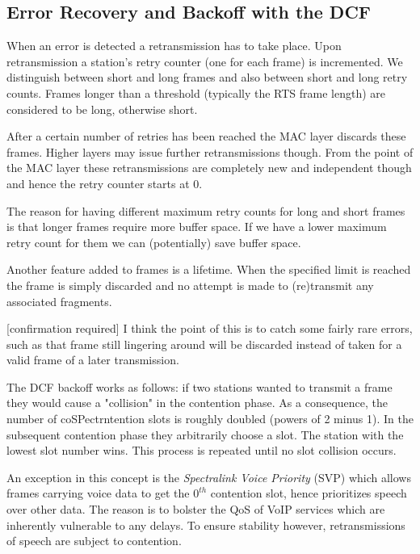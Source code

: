 \documentclass{article}
\begin{document}
	\subsection{Error Recovery and Backoff with the DCF}
	
	When an error is detected a retransmission has to take place. Upon retransmission a station's retry counter (one for each frame) is incremented. We distinguish between short and long frames and also between short and long retry counts. Frames longer than a threshold (typically the RTS frame length) are considered to be long, otherwise short.
	
	\bigskip
	
	After a certain number of retries has been reached the MAC layer discards these frames. Higher layers may issue further retransmissions though. From the point of the MAC layer these retransmissions are completely new and independent though and hence the retry counter starts at 0.
	
	\bigskip
	
	The reason for having different maximum retry counts for long and short frames is that longer frames require more buffer space. If we have a lower maximum retry count for them we can (potentially) save buffer space.
	
	\bigskip
	
	Another feature added to frames is a lifetime. When the specified limit is reached the frame is simply discarded and no attempt is made to (re)transmit any associated fragments.   
	
	\medskip
	
	\color{blue}
	[confirmation required] I think the point of this is to catch some fairly rare errors, such as that frame still lingering around will be discarded instead of taken for a valid frame of a later transmission.
	\color{black}
	
	\bigskip
	
	The DCF backoff works as follows: if two stations wanted to transmit a frame they would cause a "collision" in the contention phase. As a consequence, the number of coSPectrntention slots is roughly doubled (powers of 2 minus 1). In the subsequent contention phase they arbitrarily choose a slot. The station with the lowest slot number wins. This process is repeated until no slot collision occurs.
	
	\bigskip
	
	An exception in this concept is the \emph{Spectralink Voice Priority} (SVP) which allows frames carrying voice data to get the $0^{th}$ contention slot, hence prioritizes speech over other data. The reason is to bolster the QoS of VoIP services which are inherently vulnerable to any delays. To ensure stability however, retransmissions of speech are subject to contention.
	
\end{document}
